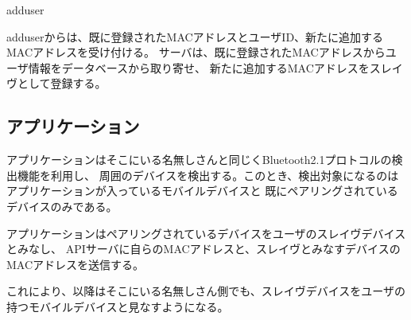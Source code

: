 \begin{description}

  \item{adduser}

adduserからは、既に登録されたMACアドレスとユーザID、新たに追加するMACアドレスを受け付ける。
サーバは、既に登録されたMACアドレスからユーザ情報をデータベースから取り寄せ、
新たに追加するMACアドレスをスレイヴとして登録する。

\end{description}

\subsection{アプリケーション}

アプリケーションはそこにいる名無しさんと同じくBluetooth2.1プロトコルの検出機能を利用し、
周囲のデバイスを検出する。このとき、検出対象になるのはアプリケーションが入っているモバイルデバイスと
既にペアリングされているデバイスのみである。

アプリケーションはペアリングされているデバイスをユーザのスレイヴデバイスとみなし、
APIサーバに自らのMACアドレスと、スレイヴとみなすデバイスのMACアドレスを送信する。

これにより、以降はそこにいる名無しさん側でも、スレイヴデバイスをユーザの持つモバイルデバイスと見なすようになる。

